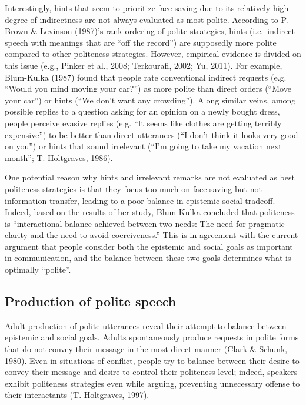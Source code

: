 \documentclass[oneside]{report}
\begin{document}
Interestingly, hints that seem to prioritize face-saving due to its
relatively high degree of indirectness are not always evaluated as most
polite. According to P. Brown \& Levinson (1987)'s rank ordering of
polite strategies, hints (i.e.~indirect speech with meanings that are
``off the record'') are supposedly more polite compared to other
politeness strategies. However, empirical evidence is divided on this
issue (e.g., Pinker et al., 2008; Terkourafi, 2002; Yu, 2011). For
example, Blum-Kulka (1987) found that people rate conventional indirect
requests (e.g. ``Would you mind moving your car?'') as more polite than
direct orders (``Move your car'') or hints (``We don't want any
crowding''). Along similar veins, among possible replies to a question
asking for an opinion on a newly bought dress, people perceive evasive
replies (e.g. ``It seems like clothes are getting terribly expensive'')
to be better than direct utterances (``I don't think it looks very good
on you'') or hints that sound irrelevant (``I'm going to take my
vacation next month''; T. Holtgraves, 1986).

One potential reason why hints and irrelevant remarks are not evaluated
as best politeness strategies is that they focus too much on face-saving
but not information transfer, leading to a poor balance in
epistemic-social tradeoff. Indeed, based on the results of her study,
Blum-Kulka concluded that politeness is ``interactional balance achieved
between two needs: The need for pragmatic clarity and the need to avoid
coerciveness.'' This is in agreement with the current argument that
people consider both the epistemic and social goals as important in
communication, and the balance between these two goals determines what
is optimally ``polite''.

\subsection{Production of polite
speech}\label{production-of-polite-speech}

Adult production of polite utterances reveal their attempt to balance
between epistemic and social goals. Adults spontaneously produce
requests in polite forms that do not convey their message in the most
direct manner (Clark \& Schunk, 1980). Even in situations of conflict,
people try to balance between their desire to convey their message and
desire to control their politeness level; indeed, speakers exhibit
politeness strategies even while arguing, preventing unnecessary offense
to their interactants (T. Holtgraves, 1997).
\end{document}
